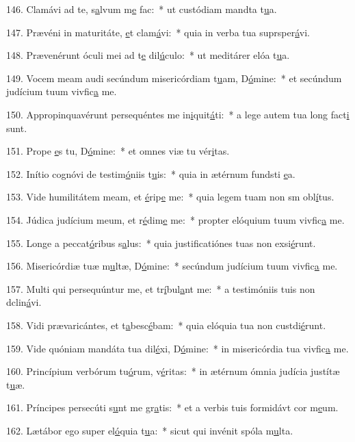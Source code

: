146. Clamávi ad te, s\uline{a}lvum m\uline{e} fac:~* ut custódiam mandta t\uline{u}a.\par 
147. Prævéni in maturitáte, \uline{e}t clam\uline{á}vi:~* quia in verba tua suprsper\uline{á}vi.\par 
148. Prævenérunt óculi mei ad t\uline{e} dil\uline{ú}culo:~* ut meditárer elóa t\uline{u}a.\par 
149. Vocem meam audi secúndum misericórdiam t\uline{u}am, D\uline{ó}mine:~* et secúndum judícium tuum vivfic\uline{a} me.\par 
150. Appropinquavérunt persequéntes me in\uline{i}quit\uline{á}ti:~* a lege autem tua long fact\uline{i} sunt.\par 
151. Prope \uline{e}s tu, D\uline{ó}mine:~* et omnes viæ tu vér\uline{i}tas.\par 
152. Inítio cognóvi de testim\uline{ó}niis t\uline{u}is:~* quia in ætérnum fundsti \uline{e}a.\par 
153. Vide humilitátem meam, et \uline{é}rip\uline{e} me:~* quia legem tuam non sm obl\uline{í}tus.\par 
154. Júdica judícium meum, et r\uline{é}dim\uline{e} me:~* propter elóquium tuum vivfic\uline{a} me.\par 
155. Longe a peccat\uline{ó}ribus s\uline{a}lus:~* quia justificatiónes tuas non exsi\uline{é}runt.\par 
156. Misericórdiæ tuæ m\uline{u}ltæ, D\uline{ó}mine:~* secúndum judícium tuum vivfic\uline{a} me.\par 
157. Multi qui persequúntur me, et tr\uline{í}bul\uline{a}nt me:~* a testimóniis tuis non dclin\uline{á}vi.\par 
158. Vidi prævaricántes, et t\uline{a}besc\uline{é}bam:~* quia elóquia tua non custdi\uline{é}runt.\par 
159. Vide quóniam mandáta tua dil\uline{é}xi, D\uline{ó}mine:~* in misericórdia tua vivfic\uline{a} me.\par 
160. Princípium verbórum tu\uline{ó}rum, v\uline{é}ritas:~* in ætérnum ómnia judícia justítæ t\uline{u}æ.\par 
161. Príncipes persecúti s\uline{u}nt me gr\uline{a}tis:~* et a verbis tuis formidávt cor m\uline{e}um.\par 
162. Lætábor ego super el\uline{ó}quia t\uline{u}a:~* sicut qui invénit spóla m\uline{u}lta.\par 
